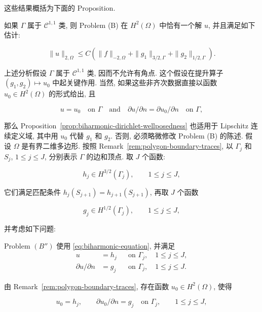 这些结果概括为下面的 Proposition.

\setcounter{statement}{2}
\renewcommand{\theHstatement}{proposition.\thesection.\arabic{statement}}
\begin{Proposition}\label{prop:biharmonic-dirichlet-wellposedness}
如果 $\Gamma$ 属于 $\mathcal C^{1,1}$ 类, 则 Problem (B) 在 $H^2(\Omega)$ 中恰有一个解 $u$, 并且满足如下估计:

\begin{equation}\label{eq:biharmonic-stability-h2}
\|u\|_{2,\Omega}\leq C(\|f\|_{-2,\Omega}+\|g_1\|_{3/2,\Gamma}+\|g_2\|_{1/2,\Gamma}).
\end{equation}
\end{Proposition}

上述分析假设 $\Gamma$ 属于 $\mathcal C^{1,1}$ 类, 因而不允许有角点. 这个假设在提升算子 $(g_1,g_2)\mapsto u_0$ 中起关键作用. 当然, 如果这些非齐次数据直接以函数 $u_0\in H^2(\Omega)$ 的形式给出, 且

\[
u=u_0\quad\text{on }\Gamma\quad\text{and}\quad\partial u/\partial n=\partial u_0/\partial n\quad\text{on }\Gamma,
\]

那么 Proposition~\ref{prop:biharmonic-dirichlet-wellposedness} 也适用于 Lipschitz 连续定义域,
其中用 $u_0$ 代替 $g_1$ 和 $g_2$. 否则, 必须略微修改 Problem (B) 的陈述.
假设 $\Omega$ 是有界二维多边形. 按照 Remark~\ref{rem:polygon-boundary-traces},
以 $\Gamma_j$ 和 $S_j$, $1\leq j\leq J$, 分别表示 $\Gamma$ 的边和顶点. 取 $J$ 个函数:


\[
h_j\in H^{3/2}(\Gamma_j),\qquad1\leq j\leq J,
\]

它们满足匹配条件 $h_j(S_{j+1})=h_{j+1}(S_{j+1})$, 再取 $J$ 个函数

\[
g_j\in H^{1/2}(\Gamma_j),\qquad1\leq j\leq J,
\]

并考虑如下问题:

\noindent Problem $(B'')$ 使用 \eqref{eq:biharmonic-equation}, 并满足
\begin{align}
u&=h_j&&\text{on }\Gamma_j,\quad1\leq j\leq J,
\label{eq:biharmonic-polygon-dirichlet}\\
\partial u/\partial n&=g_j&&\text{on }\Gamma_j,\quad1\leq j\leq J.
\label{eq:biharmonic-polygon-normal}
\end{align}

由 Remark~\ref{rem:polygon-boundary-traces}, 存在函数 $u_0\in H^2(\Omega)$, 使得

\[
u_0=h_j,\qquad\partial u_0/\partial n=g_j\quad\text{on }\Gamma_j,\qquad1\leq j\leq J,
\]

